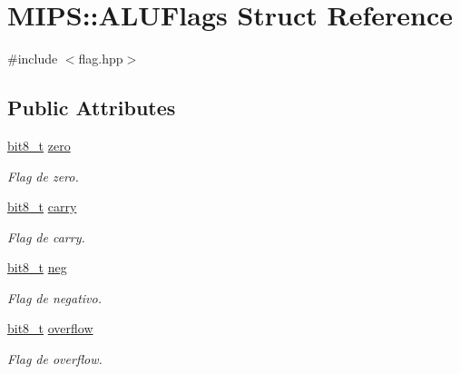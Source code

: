 \hypertarget{structMIPS_1_1ALUFlags}{}\section{M\+I\+PS\+:\+:A\+L\+U\+Flags Struct Reference}
\label{structMIPS_1_1ALUFlags}


{\ttfamily \#include $<$flag.\+hpp$>$}

\subsection*{Public Attributes}
\begin{DoxyCompactItemize}
\item 
\hyperlink{core_8hpp_a6074bae122ae7b527864eec42c728c3c}{bit8\+\_\+t} \hyperlink{structMIPS_1_1ALUFlags_a75e610fd16cb450f1870c9fb672125eb}{zero}\hypertarget{structMIPS_1_1ALUFlags_a75e610fd16cb450f1870c9fb672125eb}{}\label{structMIPS_1_1ALUFlags_a75e610fd16cb450f1870c9fb672125eb}

\begin{DoxyCompactList}\small\item\em Flag de zero. \end{DoxyCompactList}\item 
\hyperlink{core_8hpp_a6074bae122ae7b527864eec42c728c3c}{bit8\+\_\+t} \hyperlink{structMIPS_1_1ALUFlags_aa00c4b1911180ec6ce00126f3475a5ba}{carry}\hypertarget{structMIPS_1_1ALUFlags_aa00c4b1911180ec6ce00126f3475a5ba}{}\label{structMIPS_1_1ALUFlags_aa00c4b1911180ec6ce00126f3475a5ba}

\begin{DoxyCompactList}\small\item\em Flag de carry. \end{DoxyCompactList}\item 
\hyperlink{core_8hpp_a6074bae122ae7b527864eec42c728c3c}{bit8\+\_\+t} \hyperlink{structMIPS_1_1ALUFlags_a9183433b8cc39c500f8039d34d329b3d}{neg}\hypertarget{structMIPS_1_1ALUFlags_a9183433b8cc39c500f8039d34d329b3d}{}\label{structMIPS_1_1ALUFlags_a9183433b8cc39c500f8039d34d329b3d}

\begin{DoxyCompactList}\small\item\em Flag de negativo. \end{DoxyCompactList}\item 
\hyperlink{core_8hpp_a6074bae122ae7b527864eec42c728c3c}{bit8\+\_\+t} \hyperlink{structMIPS_1_1ALUFlags_a9f3ea56726a1e5f09fd13d8f7be3c234}{overflow}\hypertarget{structMIPS_1_1ALUFlags_a9f3ea56726a1e5f09fd13d8f7be3c234}{}\label{structMIPS_1_1ALUFlags_a9f3ea56726a1e5f09fd13d8f7be3c234}

\begin{DoxyCompactList}\small\item\em Flag de overflow. \end{DoxyCompactList}\end{DoxyCompactItemize}


